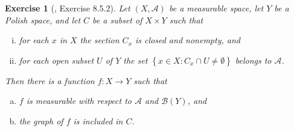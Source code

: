 \documentclass[11pt]{article}
\theoremstyle{plain}
\newtheorem{exercise}{Exercise}
\theoremstyle{definition}
\theoremstyle{remark}
\begin{document}
\begin{exercise}[\cite{book:992991}, Exercise 8.5.2]
    Let $(X, \mathscr A)$ be a measurable space, let $Y$ be a Polish space, and let $C$ be a subset of $X \times Y$ such that
    \begin{enumerate}[(i)]
        \item 
            for each $x$ in $X$ the section $C_x$ is closed and nonempty, and
        \item
            for each open subset $U$ of $Y$ the set $\left\{ x\in X : C_x \cap U \neq \emptyset \right\}$ belongs to $\mathscr A$.
    \end{enumerate}
    Then there is a function $f: X \to Y$ such that
    \begin{enumerate}[(a)]
        \item 
            $f$ is measurable with respect to $\mathscr A$ and $\mathscr B (Y)$, and
        \item
            the graph of $f$ is included in $C$.
    \end{enumerate}
\end{exercise}
\end{document}

